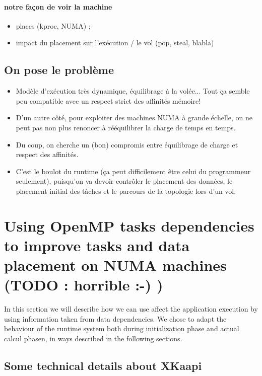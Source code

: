 \documentclass{Styles/llncs}
\begin{document}
\paragraph{notre façon de voir la machine}
\begin{itemize}
\item places (kproc, NUMA) ;
\item impact du placement sur l'exécution / le vol (pop, steal, blabla)
\end{itemize}

\subsection{On pose le problème}
\begin{itemize}
  \item Modèle d'exécution très dynamique, équilibrage à la
    volée... Tout ça semble peu compatible avec un respect strict des
    affinités mémoire!
  \item D'un autre côté, pour exploiter des machines NUMA à grande
    échelle, on ne peut pas non plus renoncer à rééquilibrer la charge
    de temps en temps.
  \item Du coup, on cherche un (bon) compromis entre équilibrage de
    charge et respect des affinités.
  \item C'est le boulot du runtime (ça peut difficilement être celui
    du programmeur seulement), puisqu'on va devoir contrôler le
    placement des données, le placement initial des tâches et le
    parcours de la topologie lors d'un vol.
\end{itemize}

\section{Using OpenMP tasks dependencies to improve tasks and data
  placement on NUMA machines (TODO : horrible :-) )}

In this section we will describe how we can use affect the application execution
by using information taken from data dependencies.
We chose to adapt the behaviour of the runtime system both during initialization
phase and actual calcul phasen, in ways described in the following sections.


\subsection{Some technical details about XKaapi}
\end{document}
